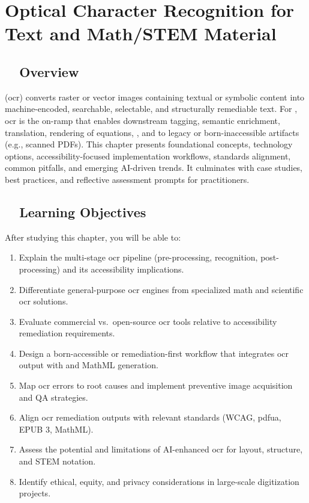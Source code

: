\chapter{Optical Character Recognition for Text and Math/STEM Material}
\label{chap:ocr}

\section{~~Overview}
\label{sec:ocr-overview}
 (\gls{ocr}) converts raster or vector images containing textual or symbolic content into machine-encoded, searchable, selectable, and structurally remediable text. For , \gls{ocr} is the on-ramp that enables downstream tagging, semantic enrichment,  translation,  rendering of equations,  , and  to legacy or born-inaccessible artifacts (e.g., scanned PDFs). This chapter presents foundational concepts, technology options, accessibility-focused implementation workflows, standards alignment, common pitfalls, and emerging AI-driven trends. It culminates with case studies, best practices, and reflective assessment prompts for practitioners.

\section{~~Learning Objectives}
\label{sec:ocr-learning-objectives}
After studying this chapter, you will be able to:
\begin{enumerate}
	\item Explain the multi-stage \gls{ocr} pipeline (pre-processing, recognition, post-processing) and its accessibility implications.
	\item Differentiate general-purpose \gls{ocr} engines from specialized math and scientific \gls{ocr} solutions.
	\item Evaluate commercial vs.\ open-source \gls{ocr} tools relative to accessibility remediation requirements.
	\item Design a born-accessible or remediation-first workflow that integrates \gls{ocr} output with  and MathML generation.
	\item Map \gls{ocr} errors to root causes and implement preventive image acquisition and QA strategies.
	\item Align \gls{ocr} remediation outputs with relevant standards (WCAG, \gls{pdfua}, EPUB 3, MathML).
	\item Assess the potential and limitations of AI-enhanced \gls{ocr} for layout, structure, and STEM notation.
	\item Identify ethical, equity, and privacy considerations in large-scale digitization projects.
\end{enumerate}

